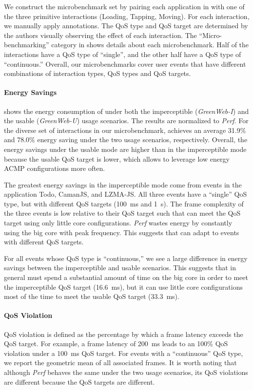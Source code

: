 We construct the microbenchmark set by pairing each application in  with one of the three primitive interactions (Loading, Tapping, Moving). For each interaction, we manually apply \greenweb annotations. The QoS type and QoS target are determined by the authors visually observing the effect of each interaction. The ``Micro-benchmarking'' category in  shows details about each microbenchmark. Half of the interactions have a QoS type of ``single'', and the other half have a QoS type of ``continuous.'' Overall, our microbenchmarks cover user events that have different combinations of interaction types, QoS types and QoS targets. 

\paragraph{Energy Savings}  shows the energy consumption of \greenweb under both the imperceptible (\textit{GreenWeb-I}) and the usable (\textit{GreenWeb-U}) usage scenarios. The results are normalized to \textit{Perf}. For the diverse set of interactions in our microbenchmark, \greenweb achieves an average 31.9\% and 78.0\% energy saving under the two usage scenarios, respectively. Overall, the energy savings under the usable mode are higher than in the imperceptible mode because the usable QoS target is lower, which allows \greenweb to leverage low energy ACMP configurations more often.

The greatest energy savings in the imperceptible mode come from events in the application \textsf{Todo}, \textsf{CamanJS}, and \textsf{LZMA-JS}. All three events have a ``single'' QoS type, but with different QoS targets (100~ms and 1~s). The frame complexity of the three events is low relative to their QoS target such that \greenweb can meet the QoS target using only little core configurations. \textit{Perf} wastes energy by constantly using the big core with peak frequency. This suggests that \greenweb can adapt to events with different QoS targets.

For all events whose QoS type is ``continuous,'' we see a large difference in energy savings between the imperceptible and usable scenarios. This suggests that in general \greenweb must spend a substantial amount of time on the big core in order to meet the imperceptible QoS target (16.6~ms), but it can use little core configurations most of the time to meet the usable QoS target (33.3~ms). 

\paragraph{QoS Violation} QoS violation is defined as the percentage by which a frame latency exceeds the QoS target. For example, a frame latency of 200~ms leads to an 100\% QoS violation under a 100~ms QoS target. For events with a ``continuous'' QoS type, we report the geometric mean of all associated frames. It is worth noting that although \textit{Perf} behaves the same under the two usage scenarios, its QoS violations are different because the QoS targets are different.

